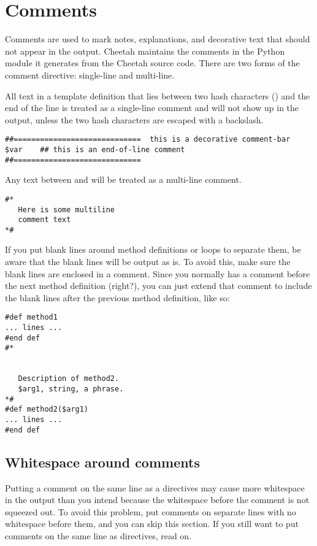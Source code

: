 \section{Comments}
\label{comments}

Comments are used to mark notes, explanations, and decorative text that should
not appear in the output.  Cheetah maintains the comments in the Python module
it generates from the Cheetah source code. There are two forms of the comment
directive: single-line and multi-line.

All text in a template definition that lies between two hash characters
(\code{\#\#}) and the end of the line is treated as a single-line comment and
will not show up in the output, unless the two hash characters are escaped with
a backslash.
\begin{verbatim}
##=============================  this is a decorative comment-bar
$var    ## this is an end-of-line comment
##=============================
\end{verbatim}

Any text between \code{\#*} and \code{*\#} will be treated as a multi-line
comment.
\begin{verbatim}
#*
   Here is some multiline
   comment text
*#
\end{verbatim}

If you put blank lines around method definitions or loops to separate them,
be aware that the blank lines will be output as is.  To avoid this, make sure
the blank lines are enclosed in a comment.  Since you normally has a
comment before the next method definition (right?), you can just extend that
comment to include the blank lines after the previous method definition, like
so:
\begin{verbatim}
#def method1
... lines ...
#end def
#*


   Description of method2.
   $arg1, string, a phrase.
*#
#def method2($arg1)
... lines ...
#end def
\end{verbatim}

\subsection{Whitespace around comments}
\label{comments.whitespace}

Putting a comment on the same line as a directives may cause more whitespace in
the output than you intend because the whitespace before the comment is not
squeezed out.  To avoid this problem, put comments on separate lines with no
whitespace before them, and you can skip this section.  If you still want to
put comments on the same line as directives, read on.

